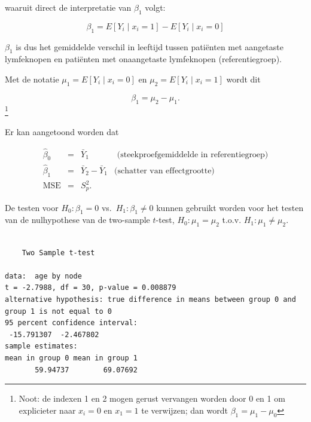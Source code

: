 \documentclass[
  dutch,
  letterpaper,
  12pt]{book}
\newenvironment{Shaded}{\begin{snugshade}}{\end{snugshade}}
\newcommand{\AttributeTok}[1]{\textcolor[rgb]{0.40,0.45,0.13}{#1}}
\newcommand{\ConstantTok}[1]{\textcolor[rgb]{0.56,0.35,0.01}{#1}}
\newcommand{\FunctionTok}[1]{\textcolor[rgb]{0.28,0.35,0.67}{#1}}
\newcommand{\NormalTok}[1]{\textcolor[rgb]{0.00,0.23,0.31}{#1}}
\newcommand{\OtherTok}[1]{\textcolor[rgb]{0.00,0.23,0.31}{#1}}
\newcommand{\SpecialCharTok}[1]{\textcolor[rgb]{0.37,0.37,0.37}{#1}}
\theoremstyle{definition}
\theoremstyle{definition}
\theoremstyle{definition}
\theoremstyle{remark}
\begin{document}
waaruit direct de interpretatie van \(\beta_1\) volgt:

\[   \beta_1 = E\left[Y_i\mid x_i=1\right]-E\left[Y_i\mid x_i=0\right]\]

\(\beta_1\) is dus het gemiddelde verschil in leeftijd tussen patiënten
met aangetaste lymfeknopen en patiënten met onaangetaste lymfeknopen
(referentiegroep).

Met de notatie \(\mu_1= E\left[Y_i\mid x_i=0\right]\) en
\(\mu_2= E\left[Y_i\mid x_i=1\right]\) wordt dit

\[\beta_1 = \mu_2-\mu_1.\]\footnote{Noot: de indexen 1 en 2 mogen gerust
  vervangen worden door 0 en 1 om explicieter naar \(x_i=0\) en
  \(x_1=1\) te verwijzen; dan wordt \(\beta_1=\mu_1-\mu_0\)}

Er kan aangetoond worden dat

\[\begin{array}{ccll}
 \hat\beta_0
   &=& \bar{Y}_1&\text{ (steekproefgemiddelde in referentiegroep)} \\
 \hat\beta_1
   &=& \bar{Y}_2-\bar{Y}_1&\text{(schatter van effectgrootte)} \\
 \text{MSE}
   &=& S_p^2 .
\end{array}\]

De testen voor \(H_0:\beta_1=0\) vs.~\(H_1:\beta_1\neq0\) kunnen
gebruikt worden voor het testen van de nulhypothese van de two-sample
\(t\)-test, \(H_0:\mu_1=\mu_2\) t.o.v. \(H_1:\mu_1\neq\mu_2\).

\begin{Shaded}
\end{Shaded}

\begin{verbatim}

    Two Sample t-test

data:  age by node
t = -2.7988, df = 30, p-value = 0.008879
alternative hypothesis: true difference in means between group 0 and group 1 is not equal to 0
95 percent confidence interval:
 -15.791307  -2.467802
sample estimates:
mean in group 0 mean in group 1 
       59.94737        69.07692 
\end{verbatim}
\end{document}
